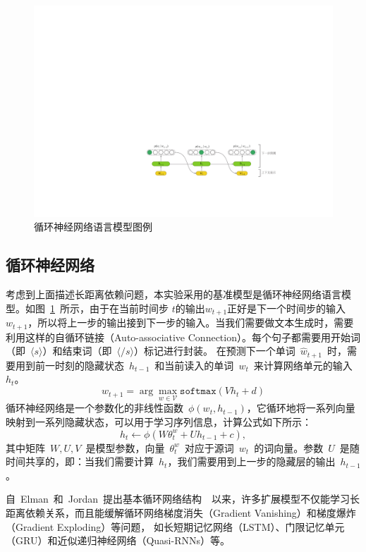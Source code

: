 \begin{figure}[!t]
  \centering
  \includegraphics[width=.99\columnwidth]{./figures/lm.pdf}
  \caption{循环神经网络语言模型图例\label{fig:lm}}
\end{figure}

\subsection{循环神经网络}
考虑到上面描述长距离依赖问题，本实验采用的基准模型是循环神经网络语言模型。如图~\ref{fig:lm}~所示，由于在当前时间步 $t$的输出$w_{t+1}$正好是下一个时间步的输入~$w_{t+1}$，所以将上一步的输出接到下一步的输入。当我们需要做文本生成时，需要利用这样的自循环链接（Auto-associative Connection）。每个句子都需要用开始词（即~$\langle s\rangle$）和结束词（即~$\langle /s\rangle$）标记进行封装。
在预测下一个单词~$\hat w_{t+1}$~时，需要用到前一时刻的隐藏状态~$h_{t-1}$~和当前读入的单词~$w_t$~来计算网络单元的输入~$h_t$。
\begin{equation}
  \hat w_{t+1}=\arg\max_{w\in\mathcal{V}} \mathtt{softmax}(Vh_t+d)
\end{equation}
循环神经网络是一个参数化的非线性函数~$\phi(w_t,h_{t-1})$，它循环地将一系列向量映射到一系列隐藏状态，可以用于学习序列信息，计算公式如下所示：
\begin{equation}
  h_t \leftarrow  \phi(W\theta^w_t + U h_{t-1} +c),
\end{equation}
其中矩阵~$ W,U,V $~是模型参数，向量~$\theta^w_t$~对应于源词~$w_t$~的词向量。参数~$U$~是随时间共享的，即：当我们需要计算~$h_t$，我们需要用到上一步的隐藏层的输出~$h_{t-1}$。

自~Elman~和~Jordan~提出基本循环网络结构~~以来，许多扩展模型不仅能学习长距离依赖关系，而且能缓解循环网络梯度消失（Gradient Vanishing）和梯度爆炸（Gradient Exploding）等问题， 如长短期记忆网络（LSTM）、门限记忆单元（GRU）和近似递归神经网络（Quasi-RNNs）等。



